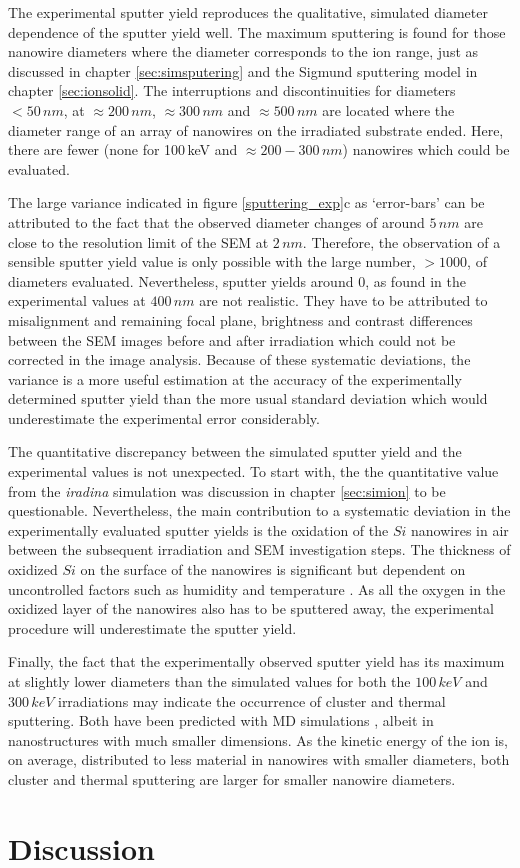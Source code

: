 The experimental sputter yield reproduces the qualitative, simulated diameter dependence of the sputter yield well. The maximum sputtering is found for those nanowire diameters where the diameter corresponds to the ion range, just as discussed in chapter \ref{sec:simsputering} and the Sigmund sputtering model in chapter \ref{sec:ionsolid}. The interruptions and discontinuities for diameters $<50\,nm$, at $\approx 200\,nm$, $\approx 300\,nm$ and $\approx 500\,nm$ are located where the diameter range of an array of nanowires on the irradiated substrate ended. Here, there are fewer (none for 100\,keV and $\approx 200 - 300\,nm$) nanowires which could be evaluated.

The large variance indicated in figure \ref{sputtering_exp}c as `error-bars' can be attributed to the fact that the observed diameter changes of around $5\,nm$ are close to the resolution limit of the SEM at $2\,nm$. Therefore, the observation of a sensible sputter yield value is only possible with the large number, $>1000$, of diameters evaluated. Nevertheless, sputter yields around 0, as found in the experimental values at $400\,nm$ are not realistic. They have to be attributed to misalignment and remaining focal plane, brightness and contrast differences between the SEM images before and after irradiation which could not be corrected in the image analysis. Because of these systematic deviations, the variance is a more useful estimation at the accuracy of the experimentally determined sputter yield than the more usual standard deviation which would underestimate the experimental error considerably.

The quantitative discrepancy between the simulated sputter yield and the experimental values is not unexpected. To start with, the the quantitative value from the \emph{iradina} simulation was discussion in chapter \ref{sec:simion} to be questionable. Nevertheless, the main contribution to a systematic deviation in the experimentally evaluated sputter yields is the oxidation of the $Si$ nanowires in air between the subsequent irradiation and SEM investigation steps. The thickness of oxidized $Si$ on the surface of the nanowires is significant but dependent on uncontrolled factors such as humidity and temperature \cite{lukes_oxidation_1972,al-bayati_composition_1991}. As all the oxygen in the oxidized layer of the nanowires also has to be sputtered away, the experimental procedure will underestimate the sputter yield.

Finally, the fact that the experimentally observed sputter yield has its maximum at slightly lower diameters than the simulated values for both the $100\,keV$ and $300\,keV$ irradiations may indicate the occurrence of cluster and thermal sputtering. Both have been predicted with MD simulations \cite{nietiadi_sputtering_2014,urbassek_sputter_2015,anders_sputtering_2015}, albeit in nanostructures with much smaller dimensions. As the kinetic energy of the ion is, on average, distributed to less material in nanowires with smaller diameters, both cluster and thermal sputtering are larger for smaller nanowire diameters.


\section{Discussion}